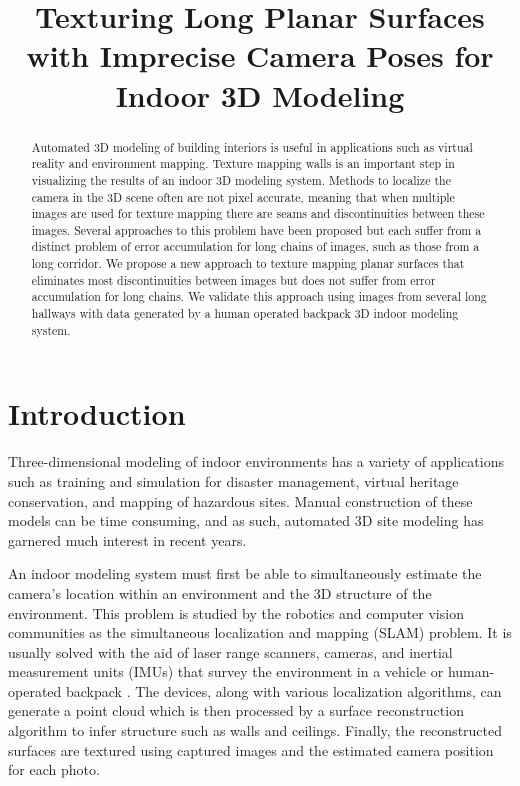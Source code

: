 \documentclass[runningheads]{llncs}
\begin{document}
\pagestyle{headings}

\mainmatter

\title{Texturing Long Planar Surfaces with Imprecise Camera Poses for Indoor 3D Modeling}

\maketitle

\begin{abstract}
Automated 3D modeling of building interiors is useful in
applications such as virtual reality and environment mapping.
Texture mapping walls is an important step in visualizing the results of an indoor 3D modeling system. Methods to localize the camera in the 3D scene often are not pixel accurate, meaning that when multiple images are used for texture mapping there are seams and discontinuities between these images. Several approaches to this problem have been proposed but each suffer from a distinct problem of error accumulation for long chains of images, such as those from a long corridor. We propose a new approach to texture mapping planar surfaces that eliminates most discontinuities between images but does not suffer from error accumulation for long chains. We validate this approach using images from several long hallways with data generated by a human operated backpack 3D indoor modeling system.

\end{abstract}

\section{Introduction}
\label{sec:intro}

Three-dimensional modeling of indoor environments has a variety of applications such as training and simulation for disaster management, virtual heritage conservation, and mapping of hazardous sites. Manual construction of these models can be time consuming, and as such, automated 3D site modeling has garnered much interest in recent years. 

An indoor modeling system must first be able to simultaneously estimate the camera's location within an environment and the 3D structure of the environment. This problem is studied by the robotics and computer vision communities as the simultaneous localization and mapping (SLAM) problem. It is usually solved with the aid of laser range scanners, cameras, and inertial measurement units (IMUs) that survey the environment in a vehicle or human-operated backpack \cite{liu2010indoor,chen2010indoor}. The devices, along with various localization algorithms, can generate a point cloud which is then processed by a surface reconstruction algorithm to infer structure such as walls and ceilings. Finally, the reconstructed surfaces are textured using captured images and the estimated camera position for each photo. 
\end{document}
